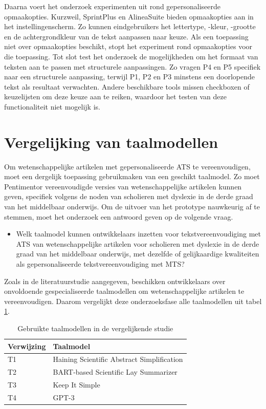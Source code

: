 Daarna voert het onderzoek experimenten uit rond gepersonaliseerde opmaakopties. Kurzweil, SprintPlus en AlineaSuite bieden opmaakopties aan in het instellingenscherm. Zo kunnen eindgebruikers het lettertype, -kleur, -grootte en de achtergrondkleur van de tekst aanpassen naar keuze. Als een toepassing niet over opmaakopties beschikt, stopt het experiment rond opmaakopties voor die toepassing. Tot slot test het onderzoek de mogelijkheden om het formaat van teksten aan te passen met structurele aanpassingen. Zo vragen P4 en P5 specifiek naar een structurele aanpassing, terwijl P1, P2 en P3 minstens een doorlopende tekst als resultaat verwachten. Andere beschikbare tools missen checkboxen of keuzelijsten om deze keuze aan te reiken, waardoor het testen van deze functionaliteit niet mogelijk is.

\section{Vergelijking van taalmodellen}
\label{sec:vergelijkende-studie}

Om wetenschappelijke artikelen met gepersonaliseerde ATS te vereenvoudigen, moet een dergelijk toepassing gebruikmaken van een geschikt taalmodel. Zo moet Pentimentor vereenvoudigde versies van wetenschappelijke artikelen kunnen geven, specifiek volgens de noden van scholieren met dyslexie in de derde graad van het middelbaar onderwijs. Om de uitvoer van het prototype nauwkeurig af te stemmen, moet het onderzoek een antwoord geven op de volgende vraag.

\begin{itemize}
	\item Welk taalmodel kunnen ontwikkelaars inzetten voor tekstvereenvoudiging met ATS van wetenschappelijke artikelen voor scholieren met dyslexie in de derde graad van het middelbaar onderwijs, met dezelfde of gelijkaardige kwaliteiten als gepersonaliseerde tekstvereenvoudiging met MTS?
\end{itemize}

Zoals in de literatuurstudie aangegeven, beschikken ontwikkelaars over onvoldoende gespecialiseerde taalmodellen om wetenschappelijke artikelen te vereenvoudigen. Daarom vergelijkt deze onderzoeksfase alle taalmodellen uit tabel \ref{table:vergelijkende-studie-taalmodellen}. 

\begin{center}
	\begin{table}[H]
		\begin{tabular}{ | m{4cm} | m{11cm} | } 
			\hline
			\textbf{Verwijzing} & \textbf{Taalmodel} \\
			\hline
			T1 & Haining Scientific Abstract Simplification \\
			\hline
			T2 & BART-based Scientific Lay Summarizer \\
			\hline
			T3 & Keep It Simple\\
			\hline
			T4 & GPT-3 \\
			\hline
		\end{tabular}
		\caption{Gebruikte taalmodellen in de vergelijkende studie}
		\label{table:vergelijkende-studie-taalmodellen}
	\end{table}
\end{center}

